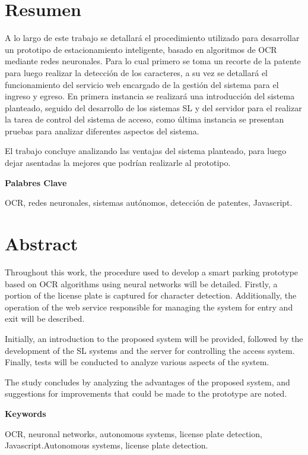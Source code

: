 \chapter*{Resumen}
A lo largo de este trabajo se detallará el procedimiento utilizado para desarrollar un prototipo de estacionamiento inteligente, basado en algoritmos de OCR mediante redes neuronales. Para lo cual primero se toma un recorte de la patente para luego realizar la detección de los caracteres, a su vez se detallará el funcionamiento del servicio web encargado de la gestión del sistema para el ingreso y egreso.
En primera instancia se realizará una introducción del sistema planteado, seguido del desarrollo de los sistemas SL y  del servidor para el realizar la tarea de control del sistema de acceso, como última instancia se presentan pruebas para analizar diferentes aspectos del sistema.

El trabajo concluye analizando las ventajas del sistema planteado, para luego dejar asentadas la mejores que podrían realizarle al prototipo.



\vspace*{\fill}
\noindent \textbf{Palabres Clave}

OCR, redes neuronales, sistemas autónomos, detección de patentes, Javascript.

\chapter*{Abstract}
Throughout this work, the procedure used to develop a smart parking prototype based on OCR algorithms using neural networks will be detailed. Firstly, a portion of the license plate is captured for character detection. Additionally, the operation of the web service responsible for managing the system for entry and exit will be described.

Initially, an introduction to the proposed system will be provided, followed by the development of the SL systems and the server for controlling the access system. Finally, tests will be conducted to analyze various aspects of the system.

The study concludes by analyzing the advantages of the proposed system, and suggestions for improvements that could be made to the prototype are noted.

\vspace*{\fill}
\noindent \textbf{Keywords}

OCR, neuronal networks, autonomous systems, license plate detection, Javascript.Autonomous systems, license plate detection.